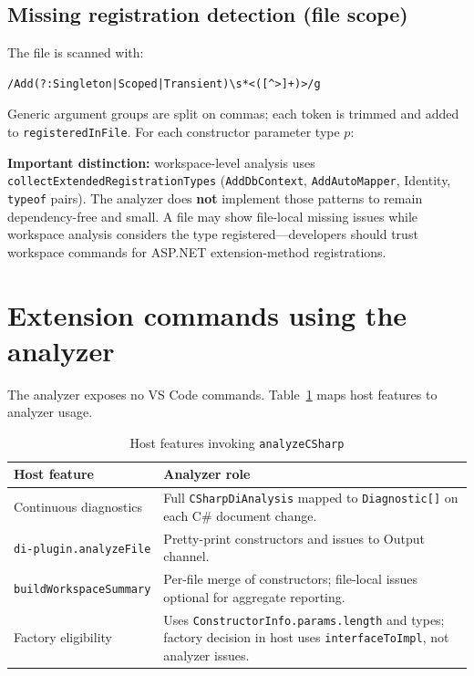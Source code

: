 \subsection{Missing registration detection (file scope)}

The file is scanned with:
\begin{lstlisting}[caption={Registration regex (file-local)}]
/Add(?:Singleton|Scoped|Transient)\s*<([^>]+)>/g
\end{lstlisting}
Generic argument groups are split on commas; each token is trimmed and added to \texttt{registeredInFile}. For each constructor parameter type \(p\):

\textbf{Important distinction:} workspace-level analysis uses \texttt{collectExtendedRegistrationTypes} (\texttt{AddDbContext}, \texttt{AddAutoMapper}, Identity, \texttt{typeof} pairs). The analyzer does \textbf{not} implement those patterns to remain dependency-free and small. A file may show file-local missing issues while workspace analysis considers the type registered---developers should trust workspace commands for ASP.NET extension-method registrations.

\section{Extension commands using the analyzer}
\label{chap3:commands}

The analyzer exposes no VS Code commands. Table~\ref{tab:analyzer-invocation} maps host features to analyzer usage.

\begin{table}[htbp]
\centering
\caption{Host features invoking \texttt{analyzeCSharp}}
\label{tab:analyzer-invocation}
\begin{tabular}{|p{4.2cm}|p{8.8cm}|}
\hline
\textbf{Host feature} & \textbf{Analyzer role} \\
\hline
Continuous diagnostics & Full \texttt{CSharpDiAnalysis} mapped to \texttt{Diagnostic[]} on each C\# document change. \\
\hline
\texttt{di-plugin.analyzeFile} & Pretty-print constructors and issues to Output channel. \\
\hline
\texttt{buildWorkspaceSummary} & Per-file merge of constructors; file-local issues optional for aggregate reporting. \\
\hline
Factory eligibility & Uses \texttt{ConstructorInfo.params.length} and types; factory decision in host uses \texttt{interfaceToImpl}, not analyzer issues. \\
\hline
\end{tabular}
\end{table}

